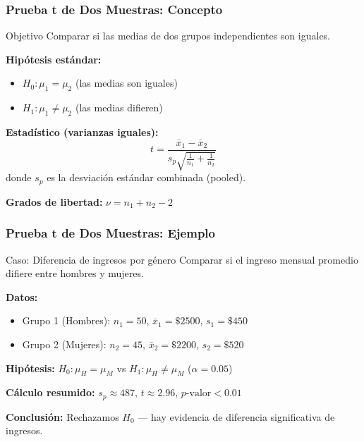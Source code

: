 \documentclass[aspectratio=169,11pt]{beamer}
\newcommand{\highlight}[1]{\textcolor{uddlight}{\bfseries #1}}
\begin{document}
\begin{frame}
  \frametitle{Prueba t de Dos Muestras: Concepto}
  \small
  \begin{block}{Objetivo}
    Comparar si las medias de dos grupos independientes son iguales.
  \end{block}

  \textbf{Hip\'otesis est\'andar:}
  \begin{itemize}
    \item $H_0: \mu_1 = \mu_2$ (las medias son iguales)
    \item $H_1: \mu_1 \neq \mu_2$ (las medias difieren)
  \end{itemize}

  \vspace{0.2cm}
  \textbf{Estad\'istico (varianzas iguales):}
  \[
    t = \frac{\bar{x}_1 - \bar{x}_2}{s_p \sqrt{\frac{1}{n_1} + \frac{1}{n_2}}}
  \]
  donde $s_p$ es la desviaci\'on est\'andar combinada (pooled).

  \vspace{0.2cm}
  \textbf{Grados de libertad:} $\nu = n_1 + n_2 - 2$
\end{frame}

\begin{frame}
  \frametitle{Prueba t de Dos Muestras: Ejemplo}
  \small
  \begin{exampleblock}{Caso: Diferencia de ingresos por g\'enero}
    Comparar si el ingreso mensual promedio difiere entre hombres y mujeres.
  \end{exampleblock}

  \textbf{Datos:}
  \begin{itemize}
    \setlength{\itemsep}{2pt}
    \item Grupo 1 (Hombres): $n_1 = 50$, $\bar{x}_1 = \$2500$, $s_1 = \$450$
    \item Grupo 2 (Mujeres): $n_2 = 45$, $\bar{x}_2 = \$2200$, $s_2 = \$520$
  \end{itemize}

  \vspace{0.2cm}
  \textbf{Hip\'otesis:} $H_0: \mu_H = \mu_M$ \quad vs \quad $H_1: \mu_H \neq \mu_M$ \quad ($\alpha = 0.05$)

  \vspace{0.2cm}
  \textbf{C\'alculo resumido:} $s_p \approx 487$, $t \approx 2.96$, $p\text{-valor} < 0.01$

  \vspace{0.2cm}
  \highlight{Conclusi\'on:} Rechazamos $H_0$ --- hay evidencia de diferencia significativa de ingresos.
\end{frame}
\end{document}

